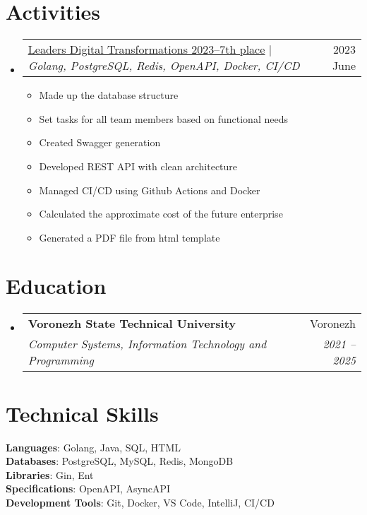 \documentclass[letterpaper,11pt]{article}
\makeatletter
\newcommand{\resumeItem}[1]{
  \item\small{
    {#1 \vspace{-2pt}}
  }
}
\newcommand{\resumeSubheading}[4]{
  \vspace{-2pt}\item
    \begin{tabular*}{0.97\textwidth}[t]{l@{\extracolsep{\fill}}r}
      \textbf{#1} & #2 \\
      \textit{\small#3} & \textit{\small #4} \\
    \end{tabular*}\vspace{-7pt}
}
\newcommand{\resumeProjectHeading}[2]{
    \item
    \begin{tabular*}{0.97\textwidth}{l@{\extracolsep{\fill}}r}
      \small#1 & #2 \\
    \end{tabular*}\vspace{-7pt}
}
\newcommand{\resumeSubHeadingListStart}{\begin{itemize}[leftmargin=0.15in, label={}]}
\newcommand{\resumeSubHeadingListEnd}{\end{itemize}}
\newcommand{\resumeItemListStart}{\begin{itemize}}
\newcommand{\resumeItemListEnd}{\end{itemize}\vspace{-5pt}}
\makeatother
\begin{document}
\section{Activities}
\resumeSubHeadingListStart
\resumeProjectHeading
{\href{https://github.com/wtkeqrf0/CV/blob/main/Leaders_Digital_Transformations_2023.pdf}{\underline{Leaders Digital Transformations 2023--7th place}} $|$ \emph{Golang, PostgreSQL, Redis, OpenAPI, Docker, CI/CD}}{2023 June}
\resumeItemListStart
\resumeItem{Made up the database structure}
\resumeItem{Set tasks for all team members based on functional needs}
\resumeItem{Created Swagger generation}
\resumeItem{Developed REST API with clean architecture}
\resumeItem{Managed CI/CD using Github Actions and Docker}
\resumeItem{Calculated the approximate cost of the future enterprise}
\resumeItem{Generated a PDF file from html template}
\resumeItemListEnd
\resumeSubHeadingListEnd

\section{Education}
\resumeSubHeadingListStart
\resumeSubheading
{Voronezh State Technical University}{Voronezh}
{Computer Systems, Information Technology and Programming}{2021 -- 2025}
\resumeSubHeadingListEnd

\section{Technical Skills}
\begin{itemize}[leftmargin=0.15in, label={}]
	\small{\item{
		\textbf{Languages}{: Golang, Java, SQL, HTML} \\
		\textbf{Databases}{: PostgreSQL, MySQL, Redis, MongoDB} \\
		\textbf{Libraries}{: Gin, Ent} \\
		\textbf{Specifications}{: OpenAPI, AsyncAPI} \\
		\textbf{Development Tools}{: Git, Docker, VS Code, IntelliJ, CI/CD} \\
	}}
\end{itemize}

\end{document}

